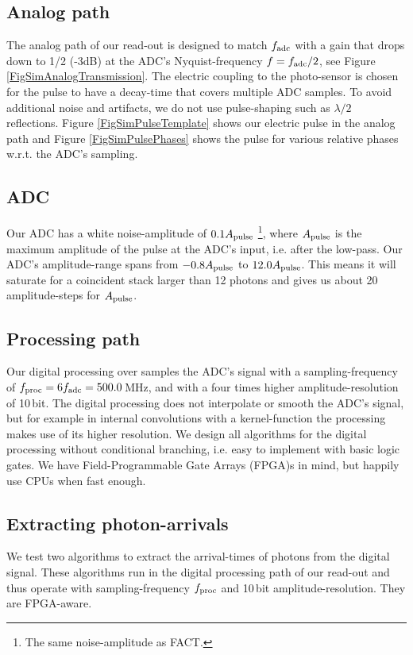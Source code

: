 \documentclass{article}%
\begin{document}
\begin{multicols}{2}
\subsection*{Analog path}%
%
The analog path of our read-out is designed to match $f_\text{adc}{}$ with a gain that drops down to 1/2 (-3dB) at the ADC's Nyquist-frequency $f = f_\text{adc}{}/2$, see Figure \ref{FigSimAnalogTransmission}.
%
The electric coupling to the photo-sensor is chosen for the pulse to have a decay-time that covers multiple ADC samples.
%
To avoid additional noise and artifacts, we do not use pulse-shaping such as $\lambda /2$ reflections.
%
Figure \ref{FigSimPulseTemplate} shows our electric pulse in the analog path and Figure \ref{FigSimPulsePhases} shows the pulse for various relative phases w.r.t. the ADC's sampling.
%
\subsection*{ADC}%
%
Our ADC has a white noise-amplitude of $0.1A_\text{pulse}{}$ \footnote{The same noise-amplitude as FACT.}, where $A_\text{pulse}{}$ is the maximum amplitude of the pulse at the ADC's input, i.e. after the low-pass.
%
Our ADC's amplitude-range spans from $-0.8A_\text{pulse}{}$ to $12.0A_\text{pulse}{}$. This means it will saturate for a coincident stack larger than 12 photons and gives us about 20 amplitude-steps for $A_\text{pulse}{}$.
%
\subsection*{Processing path}%
%
Our digital processing over samples the ADC's signal with a sampling-frequency of $f_\text{proc}{} = 6f_\text{adc}{} = 500.0$\,MHz, and with a four times higher amplitude-resolution of 10\,bit.
%
The digital processing does not interpolate or smooth the ADC's signal, but for example in internal convolutions with a kernel-function the processing makes use of its higher resolution.
%
We design all algorithms for the digital processing without conditional branching, i.e. easy to implement with basic logic gates.
%
We have Field-Programmable Gate Arrays (FPGA)s in mind, but happily use CPUs when fast enough.
%
\subsection*{Extracting photon-arrivals}%
%
We test two algorithms to extract the arrival-times of photons from the digital signal.
%
These algorithms run in the digital processing path of our read-out and thus operate with sampling-frequency $f_\text{proc}{}$ and 10\,bit amplitude-resolution.
%
They are FPGA-aware.
%

\end{multicols}
\end{document}
